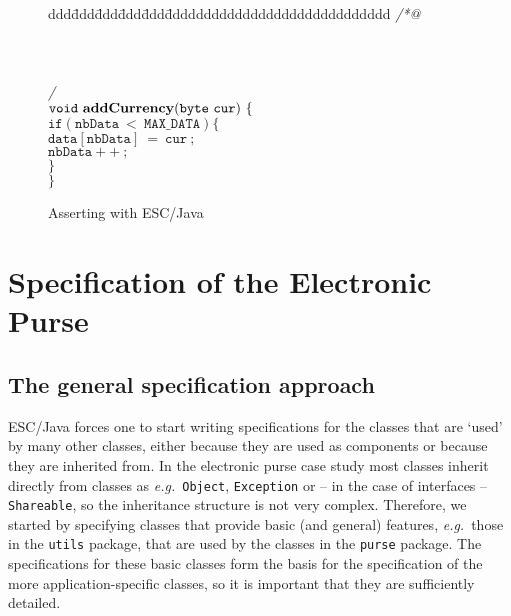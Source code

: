 \documentclass[a4paper]{llncs}
\begin{document}
\begin{figure}[hbt]
\begin{tabbing}
ddd\=ddd\=ddd\=ddd\=ddd\=ddddddddddddddddddddddddddddd \kill
{\it /*@ } \\
 \\
 \\
 \\
{\it */ } \\
$\mathtt{void\ {\bf addCurrency}(byte\ cur)\ \{}$ \\
\>$\mathtt{if(nbData\ <\ MAX\_DATA) \{}$ \\
\>\>$\mathtt{data[nbData]\ =\ cur\ ;}$ \\
\>\>$\mathtt{nbData++\ ;}$ \\
\>$\mathtt{\}}$ \\
$\mathtt{\}}$ 
\end{tabbing}
\caption{Asserting with ESC/Java}
\label{fig-add-cur}
\end{figure}






\section{Specification of the Electronic Purse}
\label{SectSpecPurse}


\subsection{The general specification approach}
ESC/Java forces one to start writing specifications for the classes
that are `used' by many other classes, either because they are used as 
components or because they are inherited from. In the electronic purse 
case study most classes inherit directly from classes as
\emph{e.g.}~\texttt{Object}, \texttt{Exception} or -- in the case of
interfaces -- \texttt{Shareable}, so the inheritance structure is not
very complex. Therefore, we started by specifying classes that
provide basic (and general) features, \emph{e.g.}~those in the
\texttt{utils} package,
that are used by the classes in the \texttt{purse} package. The
specifications for these basic classes form the basis for the
specification of the more application-specific classes, so it is
important that they are sufficiently detailed.
\end{document}
